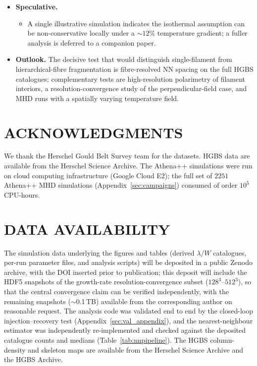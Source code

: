 \documentclass[usenatbib,twoside,twocolumn]{mnras}
\begin{document}
\begin{itemize}
    \item \textbf{Speculative.}
    \begin{itemize}
        \item A single illustrative simulation indicates the isothermal assumption can be non-conservative locally under a $\sim12\%$ temperature gradient; a fuller analysis is deferred to a companion paper.
    \end{itemize}

    \item \textbf{Outlook.} The decisive test that would distinguish single-filament from hierarchical-fibre fragmentation is fibre-resolved NN spacing on the full HGBS catalogues; complementary tests are high-resolution polarimetry of filament interiors, a resolution-convergence study of the perpendicular-field case, and MHD runs with a spatially varying temperature field.
    \end{itemize}

\section*{ACKNOWLEDGMENTS}

We thank the Herschel Gould Belt Survey team for the datasets. HGBS data are available from the Herschel Science Archive. The Athena++ simulations were run on cloud computing infrastructure (Google Cloud E2); the full set of $2251$ Athena++ MHD simulations (Appendix~\ref{sec:campaigns}) consumed of order $10^5$ CPU-hours.

\section*{DATA AVAILABILITY}

The simulation data underlying the figures and tables (derived $\lambda/W$ catalogues, per-run parameter files, and analysis scripts) will be deposited in a public Zenodo archive, with the DOI inserted prior to publication; this deposit will include the HDF5 snapshots of the growth-rate resolution-convergence subset ($128^3$--$512^3$), so that the central convergence claim can be verified independently, with the remaining snapshots ($\sim$0.1\,TB) available from the corresponding author on reasonable request. The analysis code was validated end to end by the closed-loop injection--recovery test (Appendix~\ref{sec:val_appendix}), and the nearest-neighbour estimator was independently re-implemented and checked against the deposited catalogue counts and medians (Table~\ref{tab:nnpipeline}). The HGBS column-density and skeleton maps are available from the Herschel Science Archive and the HGBS Archive.
\end{document}
